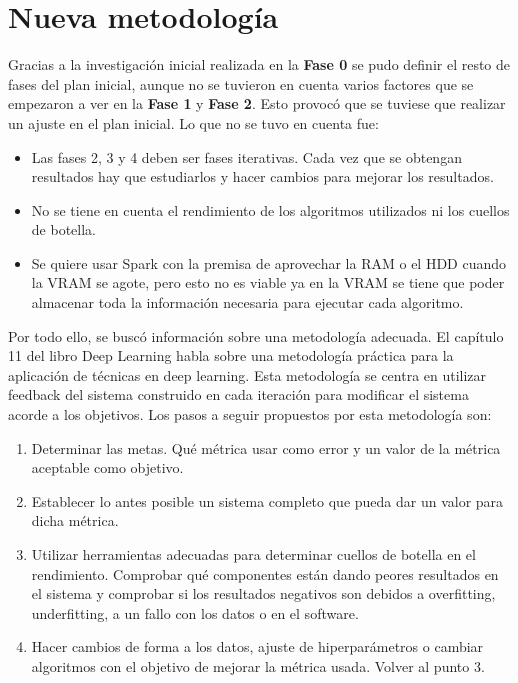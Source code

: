 \section{Nueva metodología}\label{sec:metodologia}

Gracias a la investigación inicial realizada en la \textbf{Fase 0} se pudo definir el resto de fases del plan inicial, aunque no se tuvieron en cuenta varios factores que se empezaron a ver en la \textbf{Fase 1} y \textbf{Fase 2}. Esto provocó que se tuviese que realizar un ajuste en el plan inicial. 
Lo que no se tuvo en cuenta fue:

\begin{itemize}
\item Las fases 2, 3 y 4 deben ser fases iterativas. Cada vez que se obtengan resultados hay que estudiarlos y hacer cambios para mejorar los resultados.
\item No se tiene en cuenta el rendimiento de los algoritmos utilizados ni los cuellos de botella.
\item Se quiere usar Spark con la premisa de aprovechar la RAM o el HDD cuando la VRAM se agote, pero esto no es viable ya en la VRAM se tiene que poder almacenar toda la información necesaria para ejecutar cada algoritmo.
\end{itemize}

Por todo ello, se buscó información sobre una metodología adecuada. El capítulo 11 del libro Deep Learning \cite{Goodfellow2016} habla sobre una metodología práctica para la aplicación de técnicas en deep learning. Esta metodología se centra en utilizar feedback del sistema construido en cada iteración para modificar el sistema acorde a los objetivos. Los pasos a seguir propuestos por esta metodología son:

\begin{enumerate}
\item Determinar las metas. Qué métrica usar como error y un valor de la métrica aceptable como objetivo.
\item Establecer lo antes posible un sistema completo que pueda dar un valor para dicha métrica.
\item Utilizar herramientas adecuadas para determinar cuellos de botella en el rendimiento. Comprobar qué componentes están dando peores resultados en el sistema y comprobar si los resultados negativos son debidos a overfitting, underfitting, a un fallo con los datos o en el software.
\item Hacer cambios de forma a los datos, ajuste de hiperparámetros o cambiar algoritmos con el objetivo de mejorar la métrica usada. Volver al punto 3.
\end{enumerate}

